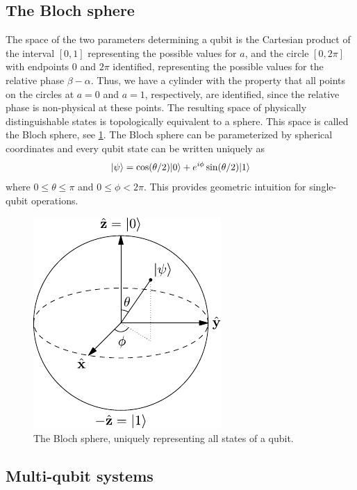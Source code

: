 \subsection{The Bloch sphere}

The space of the two parameters determining a qubit is the Cartesian product of the interval $[0,1]$ representing the possible values for $a$, and the circle $[0,2\pi]$ with endpoints $0$ and $2\pi$ identified, representing the possible values for the relative phase $\beta - \alpha$. Thus, we have a cylinder with the property that all points on the circles at $a = 0$ and $a = 1$, respectively, are identified, since the relative phase is non-physical at these points. The resulting space of physically distinguishable states is topologically equivalent to a sphere. This space is called the Bloch sphere, see \cref{fig:bloch sphere}. The Bloch sphere can be parameterized by spherical coordinates and every qubit state can be written uniquely as
\begin{equation}
  \lvert\psi\rangle = \cos(\theta/2) \lvert0\rangle + e^{i\phi}\sin(\theta/2) \lvert1\rangle
\end{equation}
where $0 \le \theta \le \pi$ and $0 \le \phi < 2\pi$. This provides geometric intuition for single-qubit operations.

\begin{figure}[!htb]
  \centering
  \includegraphics{img/bloch-sphere.pdf}
  \caption{The Bloch sphere, uniquely representing all states of a qubit.}
  \label{fig:bloch sphere}
\end{figure}



\subsection{Multi-qubit systems}

